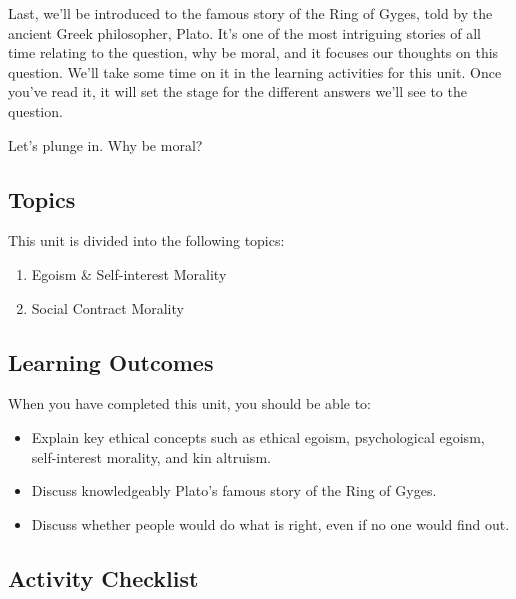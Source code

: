\documentclass[
]{book}
\providecommand{\tightlist}{%
  \setlength{\itemsep}{0pt}\setlength{\parskip}{0pt}}
\begin{document}
Last, we'll be introduced to the famous story of the Ring of Gyges, told by the ancient Greek philosopher, Plato. It's one of the most intriguing stories of all time relating to the question, why be moral, and it focuses our thoughts on this question. We'll take some time on it in the learning activities for this unit. Once you've read it, it will set the stage for the different answers we'll see to the question.

Let's plunge in. Why be moral?

\hypertarget{topics-1}{%
\subsection*{Topics}\label{topics-1}}

This unit is divided into the following topics:

\begin{enumerate}
\def\labelenumi{\arabic{enumi}.}
\tightlist
\item
  Egoism \& Self-interest Morality
\item
  Social Contract Morality
\end{enumerate}

\hypertarget{learning-outcomes-1}{%
\subsection*{Learning Outcomes}\label{learning-outcomes-1}}

When you have completed this unit, you should be able to:

\begin{itemize}
\tightlist
\item
  Explain key ethical concepts such as ethical egoism, psychological egoism, self-interest morality, and kin altruism.
\item
  Discuss knowledgeably Plato's famous story of the Ring of Gyges.
\item
  Discuss whether people would do what is right, even if no one would find out.
\end{itemize}

\hypertarget{activity-checklist-1}{%
\subsection*{Activity Checklist}\label{activity-checklist-1}}
\end{document}
